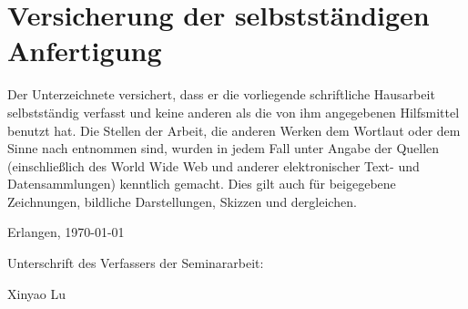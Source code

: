 \documentclass[paper=A4, ngerman, fontsize=12pt]{article}
\begin{document}
	\clearpage
	
		
	\section*{Versicherung der selbstständigen Anfertigung}
	Der Unterzeichnete versichert, dass er die vorliegende schriftliche Hausarbeit selbstständig verfasst und keine anderen als die von ihm angegebenen Hilfsmittel benutzt hat. Die Stellen der Arbeit, die anderen Werken dem Wortlaut oder dem Sinne nach entnommen sind, wurden in jedem Fall unter Angabe der Quellen (einschließlich des World Wide Web und anderer elektronischer Text- und Datensammlungen) kenntlich gemacht. Dies gilt auch für beigegebene Zeichnungen, bildliche Darstellungen, Skizzen und dergleichen. 
	
	\begin{flushright}
		\medskip\noindent
		Erlangen, \today
		
		\noindent
		Unterschrift des Verfassers der Seminararbeit: 
		
		\noindent
		Xinyao Lu
	\end{flushright}
\end{document}
